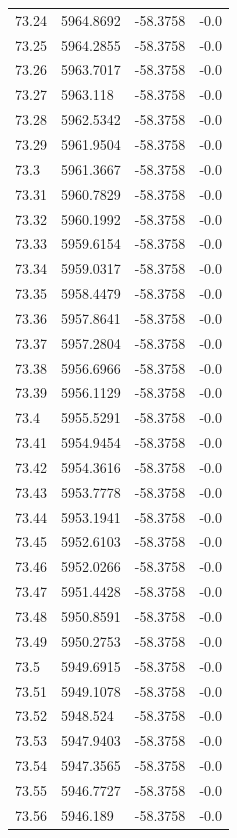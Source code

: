 \begin{table}[H]
\begin{tabular}{llll}
73.24 & 5964.8692 & -58.3758 & -0.0 \\
73.25 & 5964.2855 & -58.3758 & -0.0 \\
73.26 & 5963.7017 & -58.3758 & -0.0 \\
73.27 & 5963.118 & -58.3758 & -0.0 \\
73.28 & 5962.5342 & -58.3758 & -0.0 \\
73.29 & 5961.9504 & -58.3758 & -0.0 \\
73.3 & 5961.3667 & -58.3758 & -0.0 \\
73.31 & 5960.7829 & -58.3758 & -0.0 \\
73.32 & 5960.1992 & -58.3758 & -0.0 \\
73.33 & 5959.6154 & -58.3758 & -0.0 \\
73.34 & 5959.0317 & -58.3758 & -0.0 \\
73.35 & 5958.4479 & -58.3758 & -0.0 \\
73.36 & 5957.8641 & -58.3758 & -0.0 \\
73.37 & 5957.2804 & -58.3758 & -0.0 \\
73.38 & 5956.6966 & -58.3758 & -0.0 \\
73.39 & 5956.1129 & -58.3758 & -0.0 \\
73.4 & 5955.5291 & -58.3758 & -0.0 \\
73.41 & 5954.9454 & -58.3758 & -0.0 \\
73.42 & 5954.3616 & -58.3758 & -0.0 \\
73.43 & 5953.7778 & -58.3758 & -0.0 \\
73.44 & 5953.1941 & -58.3758 & -0.0 \\
73.45 & 5952.6103 & -58.3758 & -0.0 \\
73.46 & 5952.0266 & -58.3758 & -0.0 \\
73.47 & 5951.4428 & -58.3758 & -0.0 \\
73.48 & 5950.8591 & -58.3758 & -0.0 \\
73.49 & 5950.2753 & -58.3758 & -0.0 \\
73.5 & 5949.6915 & -58.3758 & -0.0 \\
73.51 & 5949.1078 & -58.3758 & -0.0 \\
73.52 & 5948.524 & -58.3758 & -0.0 \\
73.53 & 5947.9403 & -58.3758 & -0.0 \\
73.54 & 5947.3565 & -58.3758 & -0.0 \\
73.55 & 5946.7727 & -58.3758 & -0.0 \\
73.56 & 5946.189 & -58.3758 & -0.0 \\

\end{tabular}
\end{table}
